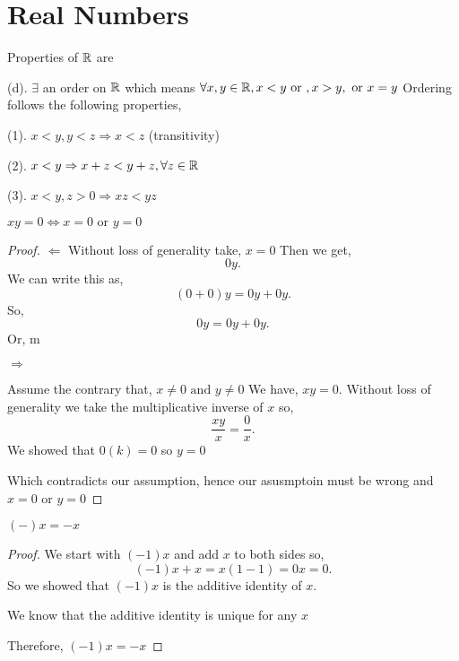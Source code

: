 \chapter*{Real Numbers}
\begin{definition} Properties of $\mathbb{R}$ are
    
    
    
    (d). $\exists$ an order on  $\mathbb{R}$ which means $\forall x,y \in \mathbb{R}, x < y \text{ or }, x > y, \text{ or } x = y$
    Ordering follows the following properties, 

    \qquad (1). $x < y, y < z \Rightarrow x < z$ (transitivity)
    
    \qquad (2). $x < y \Rightarrow x + z < y + z, \forall z \in \mathbb{R}$
    
    \qquad (3). $x < y, z > 0 \Rightarrow xz < yz$
\end{definition}

\begin{theorem}
    $xy = 0 \iff x = 0 \text{ or } y = 0 $ 
    \begin{proof} 
        $\Leftarrow$
        Without loss of generality take, $x = 0$
        Then we get,  \[
            0y
        .\] 
        We can write this as, \[
            (0 + 0)y = 0y + 0y
        .\] 
        So, \[
        0y = 0y + 0y
        .\] 
        Or, m

        $\Rightarrow$

        Assume the contrary that, $x \neq 0 \text{ and } y \neq 0$ 
        We have, $xy = 0$.
        Without loss of generality we take the multiplicative inverse of  $x$ so,
         \[
        \frac{xy}{x} = \frac{0}{x}
        .\] 
        We showed that $0(k) = 0$ so  $y = 0$

        Which contradicts our assumption, hence our asusmptoin must be wrong and  $x = 0 \text{ or } y = 0$
        
    \end{proof}
\end{theorem}
\begin{theorem}
    $(-)x = -x$
    \begin{proof}
        We start with $(-1)x$ and add $x$ to both sides so,  \[
            (-1)x + x = x (1 - 1) = 0x = 0
        .\] 
        So we showed that $(-1)x$ is the additive identity of $x$. 

        We know that the additive identity is unique for any  $x$

        Therefore,  $(-1)x = -x$
    \end{proof}
\end{theorem}

